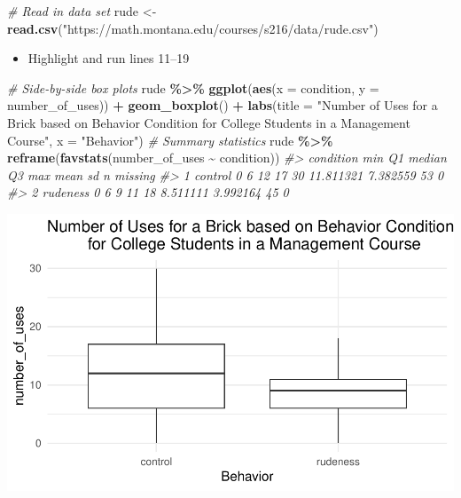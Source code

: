 \documentclass[
]{report}
\newenvironment{Shaded}{\begin{snugshade}}{\end{snugshade}}
\newcommand{\AttributeTok}[1]{\textcolor[rgb]{0.13,0.29,0.53}{#1}}
\newcommand{\CommentTok}[1]{\textcolor[rgb]{0.56,0.35,0.01}{\textit{#1}}}
\newcommand{\FunctionTok}[1]{\textcolor[rgb]{0.13,0.29,0.53}{\textbf{#1}}}
\newcommand{\NormalTok}[1]{#1}
\newcommand{\OtherTok}[1]{\textcolor[rgb]{0.56,0.35,0.01}{#1}}
\newcommand{\SpecialCharTok}[1]{\textcolor[rgb]{0.81,0.36,0.00}{\textbf{#1}}}
\newcommand{\StringTok}[1]{\textcolor[rgb]{0.31,0.60,0.02}{#1}}
\providecommand{\tightlist}{%
  \setlength{\itemsep}{0pt}\setlength{\parskip}{0pt}}
\begin{document}
\begin{Shaded}
\begin{Highlighting}[]
\CommentTok{\# Read in data set}
\NormalTok{rude }\OtherTok{\textless{}{-}} \FunctionTok{read.csv}\NormalTok{(}\StringTok{"https://math.montana.edu/courses/s216/data/rude.csv"}\NormalTok{)}
\end{Highlighting}
\end{Shaded}

\newpage

\begin{itemize}
\tightlist
\item
  Highlight and run lines 11--19
\end{itemize}

\begin{Shaded}
\begin{Highlighting}[]
\CommentTok{\# Side{-}by{-}side box plots}
\NormalTok{rude }\SpecialCharTok{\%\textgreater{}\%}
\FunctionTok{ggplot}\NormalTok{(}\FunctionTok{aes}\NormalTok{(}\AttributeTok{x =}\NormalTok{ condition, }\AttributeTok{y =}\NormalTok{ number\_of\_uses)) }\SpecialCharTok{+}
    \FunctionTok{geom\_boxplot}\NormalTok{() }\SpecialCharTok{+} 
    \FunctionTok{labs}\NormalTok{(}\AttributeTok{title =} \StringTok{"Number of Uses for a Brick based on Behavior Condition}
\StringTok{         for College Students in a Management Course"}\NormalTok{,}
         \AttributeTok{x =} \StringTok{"Behavior"}\NormalTok{) }
\CommentTok{\# Summary statistics}
\NormalTok{rude }\SpecialCharTok{\%\textgreater{}\%} 
     \FunctionTok{reframe}\NormalTok{(}\FunctionTok{favstats}\NormalTok{(number\_of\_uses }\SpecialCharTok{\textasciitilde{}}\NormalTok{ condition))}
\CommentTok{\#\textgreater{}   condition min Q1 median Q3 max      mean       sd  n missing}
\CommentTok{\#\textgreater{} 1   control   0  6     12 17  30 11.811321 7.382559 53       0}
\CommentTok{\#\textgreater{} 2  rudeness   0  6      9 11  18  8.511111 3.992164 45       0}
\end{Highlighting}
\end{Shaded}

\begin{center}\includegraphics[width=0.6\linewidth]{12-A24-inference-1ofeach-simulation_files/figure-latex/unnamed-chunk-2-1} \end{center}
\end{document}
